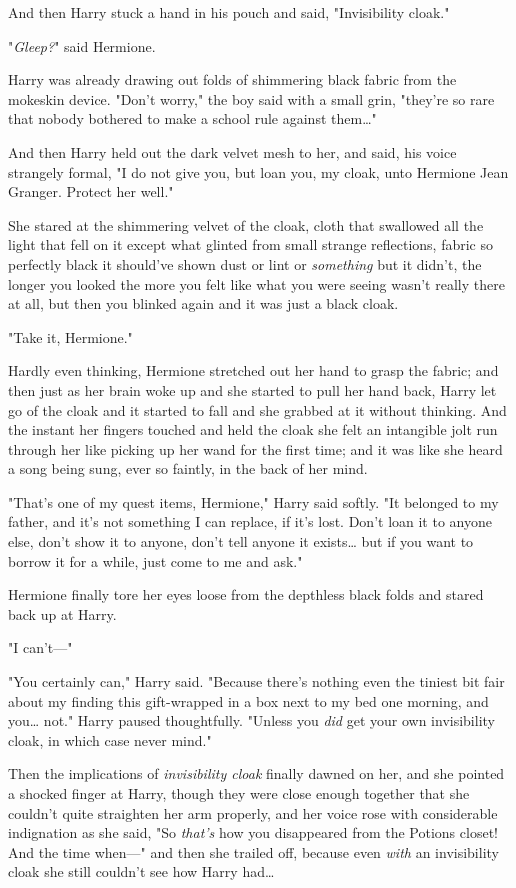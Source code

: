 And then Harry stuck a hand in his pouch and said, "Invisibility cloak."

"\emph{Gleep?}" said Hermione.

Harry was already drawing out folds of shimmering black fabric from the 
mokeskin device. "Don't worry," the boy said with a small grin, "they're so 
rare that nobody bothered to make a school rule against them{\ldots}"

And then Harry held out the dark velvet mesh to her, and said, his voice 
strangely formal, "I do not give you, but loan you, my cloak, unto Hermione 
Jean Granger. Protect her well."

She stared at the shimmering velvet of the cloak, cloth that swallowed all the 
light that fell on it except what glinted from small strange reflections, 
fabric so perfectly black it should've shown dust or lint or \emph{something} 
but it didn't, the longer you looked the more you felt like what you were 
seeing wasn't really there at all, but then you blinked again and it was just a 
black cloak.

"Take it, Hermione."

Hardly even thinking, Hermione stretched out her hand to grasp the fabric; and 
then just as her brain woke up and she started to pull her hand back, Harry let 
go of the cloak and it started to fall and she grabbed at it without thinking. 
And the instant her fingers touched and held the cloak she felt an intangible 
jolt run through her like picking up her wand for the first time; and it was 
like she heard a song being sung, ever so faintly, in the back of her mind.

"That's one of my quest items, Hermione," Harry said softly. "It belonged to my 
father, and it's not something I can replace, if it's lost. Don't loan it to 
anyone else, don't show it to anyone, don't tell anyone it exists{\ldots} but 
if you want to borrow it for a while, just come to me and ask."

Hermione finally tore her eyes loose from the depthless black folds and stared 
back up at Harry.

"I can't---"

"You certainly can," Harry said. "Because there's nothing even the tiniest bit 
fair about my finding this gift-wrapped in a box next to my bed one morning, 
and you{\ldots} not." Harry paused thoughtfully. "Unless you \emph{did} get 
your own invisibility cloak, in which case never mind."

Then the implications of \emph{invisibility cloak} finally dawned on her, and 
she pointed a shocked finger at Harry, though they were close enough together 
that she couldn't quite straighten her arm properly, and her voice rose with 
considerable indignation as she said, "So \emph{that's} how you disappeared 
from the Potions closet! And the time when---" and then she trailed off, 
because even \emph{with} an invisibility cloak she still couldn't see how Harry 
had{\ldots}

